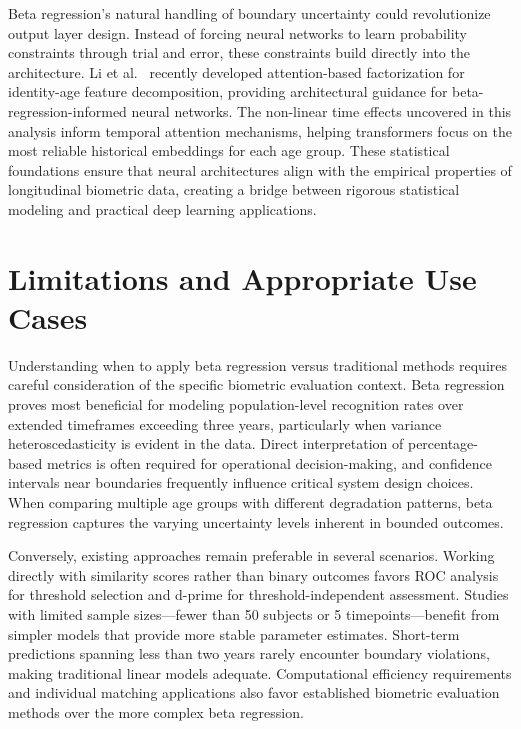 \documentclass[10pt,journal,compsoc]{IEEEtran}
\begin{document}
Beta regression's natural handling of boundary uncertainty could revolutionize output layer design. Instead of forcing neural networks to learn probability constraints through trial and error, these constraints build directly into the architecture. Li et al.~\cite{li2024} recently developed attention-based factorization for identity-age feature decomposition, providing architectural guidance for beta-regression-informed neural networks. The non-linear time effects uncovered in this analysis inform temporal attention mechanisms, helping transformers focus on the most reliable historical embeddings for each age group. These statistical foundations ensure that neural architectures align with the empirical properties of longitudinal biometric data, creating a bridge between rigorous statistical modeling and practical deep learning applications.

\section{Limitations and Appropriate Use Cases}
\label{sec:limitations_discussion}

Understanding when to apply beta regression versus traditional methods requires careful consideration of the specific biometric evaluation context. Beta regression proves most beneficial for modeling population-level recognition rates over extended timeframes exceeding three years, particularly when variance heteroscedasticity is evident in the data. Direct interpretation of percentage-based metrics is often required for operational decision-making, and confidence intervals near boundaries frequently influence critical system design choices. When comparing multiple age groups with different degradation patterns, beta regression captures the varying uncertainty levels inherent in bounded outcomes.

Conversely, existing approaches remain preferable in several scenarios. Working directly with similarity scores rather than binary outcomes favors ROC analysis for threshold selection and d-prime for threshold-independent assessment. Studies with limited sample sizes---fewer than 50 subjects or 5 timepoints---benefit from simpler models that provide more stable parameter estimates. Short-term predictions spanning less than two years rarely encounter boundary violations, making traditional linear models adequate. Computational efficiency requirements and individual matching applications also favor established biometric evaluation methods over the more complex beta regression.
\end{document}

